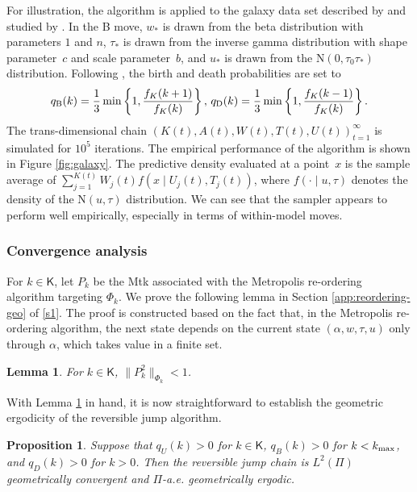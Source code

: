 \documentclass[12pt]{article}
\newtheorem{lemma}[theorem]{Lemma}
\newtheorem{proposition}[theorem]{Proposition}
\begin{document}
For illustration, the algorithm is applied to the galaxy data set described by \cite{roeder1990density} and studied by \cite{richardson1997bayesian}.
In the B move, $w_*$ is drawn from the beta distribution with parameters $1$ and $n$, $\tau_*$ is drawn from the inverse gamma distribution with shape parameter~$c$ and scale parameter~$b$, and $u_*$ is drawn from the $\mbox{N}(0, \tau_0 \tau_*)$ distribution.
Following \cite{green1995reversible}, the birth and death probabilities are set to
\[
q_{\scriptsize\mbox{B}}(k) = \frac{1}{3} \min \left\{ 1, \frac{f_K(k+1)}{f_K(k)} \right\}, \, q_{\scriptsize\mbox{D}}(k) = \frac{1}{3} \min \left\{ 1, \frac{f_K(k-1)}{f_K(k)} \right\}.
\]
The trans-dimensional chain $(K(t), A(t), W(t), T(t), U(t))_{t=1}^{\infty}$ is simulated for $10^5$ iterations.
The empirical performance of the algorithm is shown in Figure \ref{fig:galaxy}.
The predictive density evaluated at a point~$x$ is the sample average of $\sum_{j=1}^{K(t)} W_j(t) f(x \mid U_j(t), T_j(t))$, where $f(\cdot \mid u, \tau)$ denotes the density of the $\mbox{N}(u,\tau)$ distribution.
We can see that the sampler appears to perform well empirically, especially in terms of within-model moves.


\subsubsection{Convergence analysis}

For $k \in \mathsf{K}$, let $P_k$ be the Mtk associated with the Metropolis re-ordering algorithm targeting $\Phi_k$.
We prove the following lemma in Section \ref{app:reordering-geo} of \ref{s1}.
The proof is constructed based on the fact that, in the Metropolis re-ordering algorithm, the next state depends on the current state $(\alpha,w,\tau,u)$ only through $\alpha$, which takes value in a finite set.

{
\begin{lemma} \label{lem:reordering-geo}
	For $k \in \mathsf{K}$, $\|P_k^2\|_{\Phi_k} < 1$.
\end{lemma}
}

With Lemma \ref{lem:reordering-geo} in hand, it is now straightforward to establish the geometric ergodicity of the reversible jump algorithm.

\begin{proposition}
	Suppose that $q_U(k) > 0$ for $k \in \mathsf{K}$, $q_B(k) > 0$ for $k < k_{\scriptsize\mbox{max}}$, and $q_D(k) > 0$ for $k > 0$.
	Then the reversible jump chain is $L^2(\Pi)$ geometrically convergent and $\Pi$-a.e. geometrically ergodic.
\end{proposition}
\end{document}
